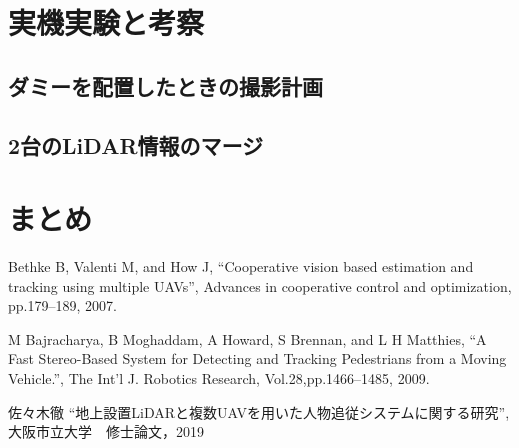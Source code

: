 \documentclass[autodetect-engine,dvipdfmx-if-dvi,ja=standard,a4j,jbase=10.5pt,twoside,twocolumn,magstyle=nomag*]{bxjsarticle}
\begin{document}
\section{実機実験と考察}
\subsection{ダミーを配置したときの撮影計画}

\subsection{2台のLiDAR情報のマージ}


\section{まとめ}


\begin{thebibliography}{9}

Bethke B, Valenti M, and How J, ``Cooperative vision based estimation and tracking using multiple UAVs'', Advances in cooperative control and optimization, pp.179--189, 2007.

M Bajracharya, B Moghaddam, A Howard, S Brennan, and L H Matthies, ``A Fast Stereo-Based System for Detecting and Tracking Pedestrians from a Moving Vehicle.'', The Int'l J. Robotics Research, Vol.28,pp.1466--1485, 2009.

佐々木徹 ``地上設置LiDARと複数UAVを用いた人物追従システムに関する研究'', 大阪市立大学　修士論文，2019
\end{thebibliography}
\end{document}
